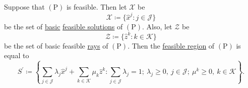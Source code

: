\begin{theorem}\label{thm:representation}
	Suppose that \((\mathrm{P})\) is feasible. Then let \(\mathcal{X}\) be
	\[
		\mathcal{X} \coloneqq \{\hat{x}^j \colon j\in \mathcal{J}\}
	\]
	be the set of \hyperref[def:basic-solution]{basic} \hyperref[def:feasible-solution]{feasible solutions} of \((\mathrm{P})\). Also, let \(\mathcal{Z}\) be
	\[
		\mathcal{Z}\coloneqq \{\hat{z}^k\colon k\in \mathcal{K}\}
	\]
	be the set of basic feasible \hyperref[def:ray]{rays} of \((\mathrm{P})\). Then the \hyperref[def:feasible-region]{feasible region} of \((\mathrm{P})\) is equal to
	\[
		S^\prime\coloneqq \left\{\sum\limits_{j\in\mathcal{J}} \lambda_{j} \hat{x}^j + \sum\limits_{k\in\mathcal{K}}\mu_k \hat{z}^k\colon \sum\limits_{j\in\mathcal{J}}\lambda_{j} = 1;\ \lambda_{j}\geq 0,\ j\in \mathcal{J};\ \mu^k\geq 0,\ k\in \mathcal{K}\right\}.
	\]
\end{theorem}
